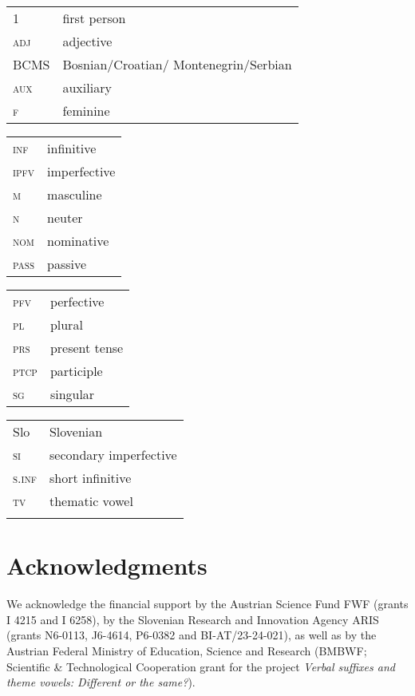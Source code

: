 \documentclass[output=paper,colorlinks,citecolor=brown]{langscibook}
\begin{document}
\begin{tabularx}{.45\textwidth}{@{}lQ}
\textsc{1}&first person\\
\textsc{adj}&adjective\\
BCMS & Bosnian/Croatian/ Montenegrin/Serbian\\
\textsc{aux}&auxiliary\\
\textsc{f}&feminine\\
\end{tabularx}
\begin{tabularx}{.45\textwidth}{lQ@{}}
\textsc{inf}&infinitive\\
\textsc{ipfv}&imperfective \\
\textsc{m}&masculine\\
\textsc{n}&neuter\\
\textsc{nom}&nominative\\
\textsc{pass}&passive\\
\end{tabularx}

\begin{tabularx}{.45\textwidth}{lQ@{}}
\textsc{pfv}&perfective\\
\textsc{pl}&plural\\
\textsc{prs}&present tense\\
\textsc{ptcp}&participle\\
\textsc{sg}&singular\\
\end{tabularx}
\begin{tabularx}{.45\textwidth}{lQ@{}}
Slo&Slovenian\\
\textsc{si}&secondary imperfective\\
\textsc{s.inf}& short infinitive\\
\textsc{tv}&thematic vowel\\
&\\
\end{tabularx}


\section*{Acknowledgments}
 We acknowledge the financial support by the Austrian Science Fund FWF (grants I 4215 and I 6258), by the Slovenian Research and Innovation Agency ARIS (grants N6-0113, J6-4614, P6-0382 and BI-AT/23-24-021), as well as by the Austrian Federal Ministry of Education, Science and Research (BMBWF; Scientific \& Technological Cooperation grant for the project \textit{Verbal suffixes and theme vowels: Different or the same?}).

\printbibliography[heading=subbibliography,notkeyword=this]
\end{document}
